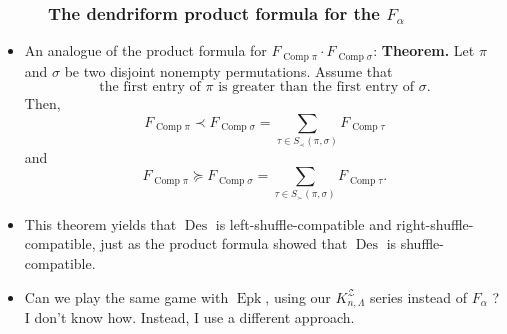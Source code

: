 \documentclass{beamer}
\newcommand{\Comp}{\operatorname{Comp}}
\newcommand{\Epk}{\operatorname{Epk}}
\newcommand{\Des}{\operatorname{Des}}
\newcommand{\fti}[1]{\frametitle{\ \ \ \ \ #1}}
\theoremstyle{plain}
\begin{document}
\begin{frame}
\fti{The dendriform product formula for the $F_\alpha$}

\begin{itemize}

\item An analogue of the product formula for $F_{\Comp\pi} \cdot F_{\Comp\sigma}$:
      \textbf{Theorem.} Let $\pi$ and $\sigma$ be two disjoint nonempty
        permutations. Assume that%
        \[
        \text{the first entry of }\pi\text{ is greater than the first entry of }%
        \sigma\text{.}%
        \]
        Then,%
        \[
        F_{\operatorname*{Comp}\pi}\left.  \prec\right.  F_{\operatorname*{Comp}%
        \sigma}=\sum_{\tau\in S_{\prec}\left(  \pi,\sigma\right)  }%
        F_{\operatorname*{Comp}\tau}%
        \]
        and%
        \[
        F_{\operatorname*{Comp}\pi}\left.  \succeq\right.  F_{\operatorname*{Comp}%
        \sigma}=\sum_{\tau\in S_{\succ}\left(  \pi,\sigma\right)  }%
        F_{\operatorname*{Comp}\tau}.
        \]

\pause

\item This theorem yields that $\Des$ is left-shuffle-compatible
      and right-shuffle-compatible,
      just as the product formula showed that $\Des$ is
      shuffle-compatible.

\pause

\item Can we play the same game with $\Epk$, using our
      $K_{n,\Lambda}^{\mathcal{Z}}$ series instead of $F_\alpha$ ?
      \pause
      \\ I don't know how. Instead, I use a different approach.

\end{itemize}
\vspace{10cm}
\end{frame}
\end{document}
